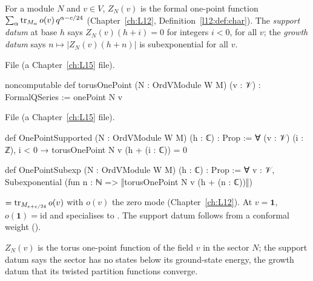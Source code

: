 \begin{definition}\label{l14:def:onepoint}
For a module $N$ and $v\in V$, $Z_N(v)$ is the formal one-point function $\sum_\alpha\operatorname{tr}_{M_\alpha}o(v)\,q^{\alpha-c/24}$
(Chapter~\ref{ch:L12}, Definition~\ref{l12:def:char}). The \emph{support datum} at base $h$ says $Z_N(v)(h+i) = 0$ for integers
$i<0$, for all $v$; the \emph{growth datum} says $n\mapsto|Z_N(v)(h+n)|$ is subexponential for all $v$.
\end{definition}
\noindent File  (a Chapter~\ref{ch:L15} file).
\begin{leancode}
noncomputable def torusOnePoint (N : OrdVModule W M) (v : 𝒱) : FormalQSeries := onePoint N v
\end{leancode}
\noindent File  (a Chapter~\ref{ch:L15} file).
\begin{leancode}
def OnePointSupported (N : OrdVModule W M) (h : ℂ) : Prop :=
  ∀ (v : 𝒱) (i : ℤ), i < 0 → torusOnePoint N v (h + (i : ℂ)) = 0

def OnePointSubexp (N : OrdVModule W M) (h : ℂ) : Prop :=
  ∀ v : 𝒱, Subexponential (fun n : ℕ => ‖torusOnePoint N v (h + (n : ℂ))‖)
\end{leancode}
\begin{dictionary}
 $=\operatorname{tr}_{M_{e+c/24}}o(v)$ with $o(v)$ the zero mode (Chapter~\ref{ch:L12}). At $v=\mathbf 1$, $o(\mathbf
1) = \mathrm{id}$ and  specialises to . The support datum follows from a
conformal weight ().
\end{dictionary}
\begin{physics}
$Z_N(v)$ is the torus one-point function of the field $v$ in the sector $N$; the support datum says the sector has no states below its ground-state energy, the growth datum that its twisted partition functions converge.
\end{physics}

